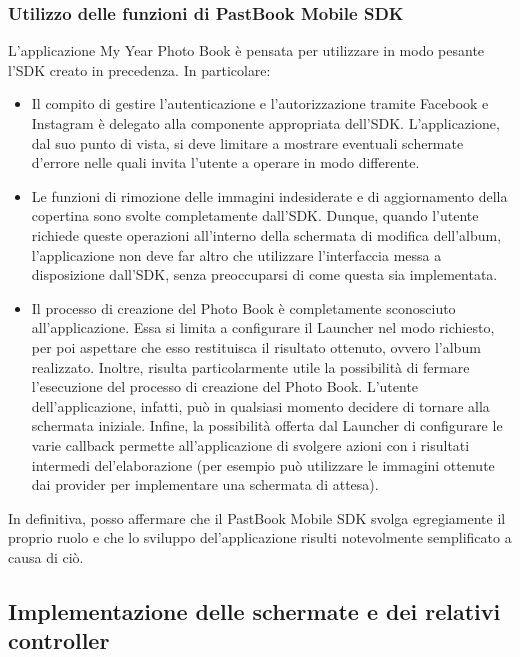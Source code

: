 			\subsubsection{Utilizzo delle funzioni di PastBook Mobile SDK}
				L'applicazione My Year Photo Book è pensata per utilizzare in modo pesante l'SDK creato in precedenza. In
				particolare:
				\begin{itemize}
					\item Il compito di gestire l'autenticazione e l'autorizzazione tramite Facebook e Instagram è delegato alla
					componente appropriata dell'SDK. L'applicazione, dal suo punto di vista, si deve limitare a mostrare
					eventuali schermate d'errore nelle quali invita l'utente a operare in modo differente.
					\item Le funzioni di rimozione delle immagini indesiderate e di aggiornamento della copertina sono svolte
					completamente dall'SDK. Dunque, quando l'utente richiede queste operazioni all'interno della schermata di
					modifica dell'album, l'applicazione non deve far altro che utilizzare l'interfaccia messa a disposizione
					dall'SDK, senza preoccuparsi di come questa sia implementata.
					\item Il processo di creazione del Photo Book è completamente sconosciuto all'applicazione. Essa si limita a
					configurare il Launcher nel modo richiesto, per poi aspettare che esso restituisca il risultato ottenuto,
					ovvero l'album realizzato. Inoltre, risulta particolarmente utile la possibilità di fermare l'esecuzione del
					processo di creazione del Photo Book. L'utente dell'applicazione, infatti, può in qualsiasi momento decidere
					di tornare alla schermata iniziale. Infine, la possibilità offerta dal Launcher di configurare le varie
					callback permette all'applicazione di svolgere azioni con i risultati intermedi del'elaborazione (per esempio
					può utilizzare le immagini ottenute dai provider per implementare una schermata di attesa).
				\end{itemize}
				In definitiva, posso affermare che il PastBook Mobile SDK svolga egregiamente il proprio ruolo e che lo sviluppo
				del'applicazione risulti notevolmente semplificato a causa di ciò.
		\subsection{Implementazione delle schermate e dei relativi controller}
